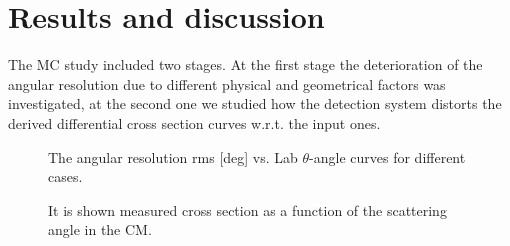 \documentclass[%
 aip,
cp,  %
 amsmath,amssymb,%
 reprint,%
]{revtex4-2}
\begin{document}
\section{Results and discussion}

The MC study included two stages. At the first stage the deterioration of the angular resolution due to different physical and geometrical factors  was investigated, at the second one we studied how the detection system distorts the derived differential cross section curves w.r.t. the input ones.

\begin{figure}[h]
\caption{The angular resolution rms [deg] vs. Lab $\theta$-angle curves for different cases.}
\label{ris:fig3}
\end{figure}

\begin{figure}[h]
\caption{It is shown measured cross section as a function of the scattering angle in the CM.}
\label{ris:fig4}
\end{figure}
\end{document}
